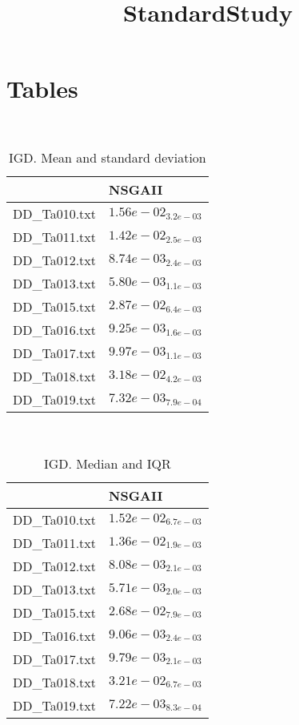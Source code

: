 \documentclass{article}
\title{StandardStudy}
\author{}
\begin{document}
\maketitle
\section{Tables}
\
\begin{table}
\caption{IGD. Mean and standard deviation}
\label{table:mean.IGD}
\centering
\begin{scriptsize}
\begin{tabular}{ll}
\hline &  NSGAII\\
\hline
DD_Ta010.txt & \cellcolor{gray95}$  1.56e-02_{ 3.2e-03}$ \\
DD_Ta011.txt & \cellcolor{gray95}$  1.42e-02_{ 2.5e-03}$ \\
DD_Ta012.txt & \cellcolor{gray95}$  8.74e-03_{ 2.4e-03}$ \\
DD_Ta013.txt & \cellcolor{gray95}$  5.80e-03_{ 1.1e-03}$ \\
DD_Ta015.txt & \cellcolor{gray95}$  2.87e-02_{ 6.4e-03}$ \\
DD_Ta016.txt & \cellcolor{gray95}$  9.25e-03_{ 1.6e-03}$ \\
DD_Ta017.txt & \cellcolor{gray95}$  9.97e-03_{ 1.1e-03}$ \\
DD_Ta018.txt & \cellcolor{gray95}$  3.18e-02_{ 4.2e-03}$ \\
DD_Ta019.txt & \cellcolor{gray95}$  7.32e-03_{ 7.9e-04}$ \\
\hline
\end{tabular}
\end{scriptsize}
\end{table}
\
\begin{table}
\caption{IGD. Median and IQR}
\label{table:median.IGD}
\begin{scriptsize}
\centering
\begin{tabular}{ll}
\hline &  NSGAII\\
\hline
DD_Ta010.txt & \cellcolor{gray95}$  1.52e-02_{ 6.7e-03}$ \\
DD_Ta011.txt & \cellcolor{gray95}$  1.36e-02_{ 1.9e-03}$ \\
DD_Ta012.txt & \cellcolor{gray95}$  8.08e-03_{ 2.1e-03}$ \\
DD_Ta013.txt & \cellcolor{gray95}$  5.71e-03_{ 2.0e-03}$ \\
DD_Ta015.txt & \cellcolor{gray95}$  2.68e-02_{ 7.9e-03}$ \\
DD_Ta016.txt & \cellcolor{gray95}$  9.06e-03_{ 2.4e-03}$ \\
DD_Ta017.txt & \cellcolor{gray95}$  9.79e-03_{ 2.1e-03}$ \\
DD_Ta018.txt & \cellcolor{gray95}$  3.21e-02_{ 6.7e-03}$ \\
DD_Ta019.txt & \cellcolor{gray95}$  7.22e-03_{ 8.3e-04}$ \\
\hline
\end{tabular}
\end{scriptsize}
\end{table}
\end{document}
